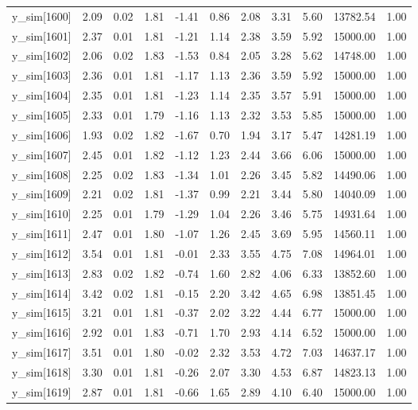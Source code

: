 \begin{table}[ht]
\begin{tabular}{rrrrrrrrrrr}
  y\_sim[1600] & 2.09 & 0.02 & 1.81 & -1.41 & 0.86 & 2.08 & 3.31 & 5.60 & 13782.54 & 1.00 \\ 
  y\_sim[1601] & 2.37 & 0.01 & 1.81 & -1.21 & 1.14 & 2.38 & 3.59 & 5.92 & 15000.00 & 1.00 \\ 
  y\_sim[1602] & 2.06 & 0.02 & 1.83 & -1.53 & 0.84 & 2.05 & 3.28 & 5.62 & 14748.00 & 1.00 \\ 
  y\_sim[1603] & 2.36 & 0.01 & 1.81 & -1.17 & 1.13 & 2.36 & 3.59 & 5.92 & 15000.00 & 1.00 \\ 
  y\_sim[1604] & 2.35 & 0.01 & 1.81 & -1.23 & 1.14 & 2.35 & 3.57 & 5.91 & 15000.00 & 1.00 \\ 
  y\_sim[1605] & 2.33 & 0.01 & 1.79 & -1.16 & 1.13 & 2.32 & 3.53 & 5.85 & 15000.00 & 1.00 \\ 
  y\_sim[1606] & 1.93 & 0.02 & 1.82 & -1.67 & 0.70 & 1.94 & 3.17 & 5.47 & 14281.19 & 1.00 \\ 
  y\_sim[1607] & 2.45 & 0.01 & 1.82 & -1.12 & 1.23 & 2.44 & 3.66 & 6.06 & 15000.00 & 1.00 \\ 
  y\_sim[1608] & 2.25 & 0.02 & 1.83 & -1.34 & 1.01 & 2.26 & 3.45 & 5.82 & 14490.06 & 1.00 \\ 
  y\_sim[1609] & 2.21 & 0.02 & 1.81 & -1.37 & 0.99 & 2.21 & 3.44 & 5.80 & 14040.09 & 1.00 \\ 
  y\_sim[1610] & 2.25 & 0.01 & 1.79 & -1.29 & 1.04 & 2.26 & 3.46 & 5.75 & 14931.64 & 1.00 \\ 
  y\_sim[1611] & 2.47 & 0.01 & 1.80 & -1.07 & 1.26 & 2.45 & 3.69 & 5.95 & 14560.11 & 1.00 \\ 
  y\_sim[1612] & 3.54 & 0.01 & 1.81 & -0.01 & 2.33 & 3.55 & 4.75 & 7.08 & 14964.01 & 1.00 \\ 
  y\_sim[1613] & 2.83 & 0.02 & 1.82 & -0.74 & 1.60 & 2.82 & 4.06 & 6.33 & 13852.60 & 1.00 \\ 
  y\_sim[1614] & 3.42 & 0.02 & 1.81 & -0.15 & 2.20 & 3.42 & 4.65 & 6.98 & 13851.45 & 1.00 \\ 
  y\_sim[1615] & 3.21 & 0.01 & 1.81 & -0.37 & 2.02 & 3.22 & 4.44 & 6.77 & 15000.00 & 1.00 \\ 
  y\_sim[1616] & 2.92 & 0.01 & 1.83 & -0.71 & 1.70 & 2.93 & 4.14 & 6.52 & 15000.00 & 1.00 \\ 
  y\_sim[1617] & 3.51 & 0.01 & 1.80 & -0.02 & 2.32 & 3.53 & 4.72 & 7.03 & 14637.17 & 1.00 \\ 
  y\_sim[1618] & 3.30 & 0.01 & 1.81 & -0.26 & 2.07 & 3.30 & 4.53 & 6.87 & 14823.13 & 1.00 \\ 
  y\_sim[1619] & 2.87 & 0.01 & 1.81 & -0.66 & 1.65 & 2.89 & 4.10 & 6.40 & 15000.00 & 1.00 \\ 

\end{tabular}
\end{table}

